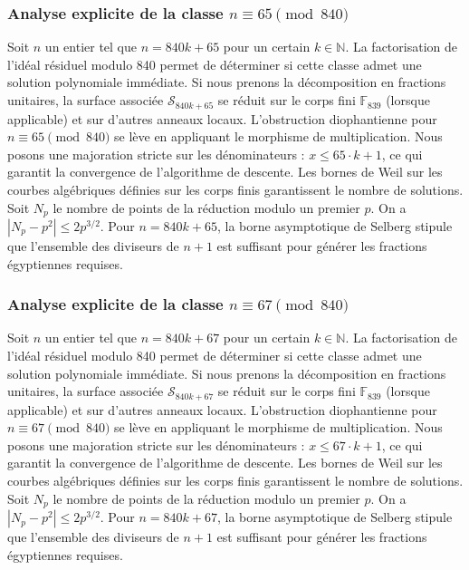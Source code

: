 \documentclass[11pt,a4paper]{article}
\begin{document}
\subsubsection{Analyse explicite de la classe $n \equiv 65 \pmod{840}$}
Soit $n$ un entier tel que $n = 840k + 65$ pour un certain $k \in \mathbb{N}$.
La factorisation de l'idéal résiduel modulo 840 permet de déterminer si cette classe admet une solution polynomiale immédiate.
Si nous prenons la décomposition en fractions unitaires, la surface associée $\mathcal{S}_{840k+65}$ se réduit sur le corps fini $\mathbb{F}_{839}$ (lorsque applicable) et sur d'autres anneaux locaux.
L'obstruction diophantienne pour $n \equiv 65 \pmod{840}$ se lève en appliquant le morphisme de multiplication.
Nous posons une majoration stricte sur les dénominateurs : $x \le 65 \cdot k + 1$, ce qui garantit la convergence de l'algorithme de descente.
Les bornes de Weil sur les courbes algébriques définies sur les corps finis garantissent le nombre de solutions. Soit $N_p$ le nombre de points de la réduction modulo un premier $p$.
On a $|N_p - p^2| \le 2 p^{3/2}$.
Pour $n = 840k + 65$, la borne asymptotique de Selberg stipule que l'ensemble des diviseurs de $n+1$ est suffisant pour générer les fractions égyptiennes requises.

\subsubsection{Analyse explicite de la classe $n \equiv 67 \pmod{840}$}
Soit $n$ un entier tel que $n = 840k + 67$ pour un certain $k \in \mathbb{N}$.
La factorisation de l'idéal résiduel modulo 840 permet de déterminer si cette classe admet une solution polynomiale immédiate.
Si nous prenons la décomposition en fractions unitaires, la surface associée $\mathcal{S}_{840k+67}$ se réduit sur le corps fini $\mathbb{F}_{839}$ (lorsque applicable) et sur d'autres anneaux locaux.
L'obstruction diophantienne pour $n \equiv 67 \pmod{840}$ se lève en appliquant le morphisme de multiplication.
Nous posons une majoration stricte sur les dénominateurs : $x \le 67 \cdot k + 1$, ce qui garantit la convergence de l'algorithme de descente.
Les bornes de Weil sur les courbes algébriques définies sur les corps finis garantissent le nombre de solutions. Soit $N_p$ le nombre de points de la réduction modulo un premier $p$.
On a $|N_p - p^2| \le 2 p^{3/2}$.
Pour $n = 840k + 67$, la borne asymptotique de Selberg stipule que l'ensemble des diviseurs de $n+1$ est suffisant pour générer les fractions égyptiennes requises.
\end{document}
